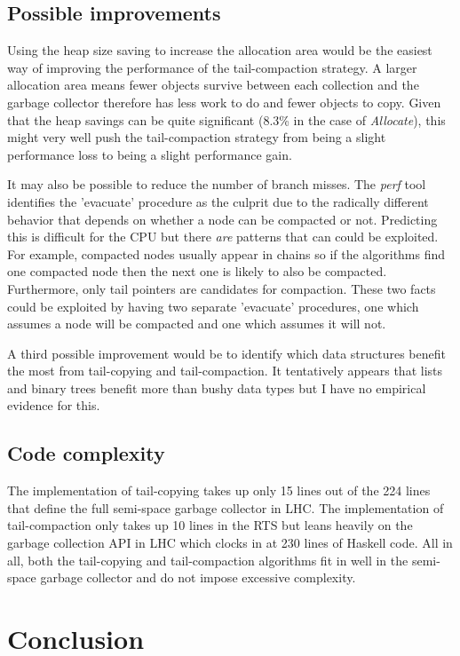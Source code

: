 \documentclass[a4paper,oneside]{memoir}
\begin{document}
\section{Possible improvements}

Using the heap size saving to increase the allocation area would be the easiest
way of improving the performance of the tail-compaction strategy. A larger
allocation area means fewer objects survive between each collection and the
garbage collector therefore has less work to do and fewer objects to copy. Given
that the heap savings can be quite significant (8.3\% in the case of
\emph{Allocate}), this might very well push the tail-compaction strategy from
being a slight performance loss to being a slight performance gain.

It may also be possible to reduce the number of branch misses. The \emph{perf}
tool identifies the 'evacuate' procedure as the culprit due to the radically
different behavior that depends on whether a node can be compacted or not.
Predicting this is difficult for the CPU but there \emph{are} patterns that can
could be exploited. For example, compacted nodes usually appear in chains so
if the algorithms find one compacted node then the next one is likely to also
be compacted. Furthermore, only tail pointers are candidates for compaction.
These two facts could be exploited by having two separate 'evacuate' procedures,
one which assumes a node will be compacted and one which assumes it will not.

A third possible improvement would be to identify which data structures benefit
the most from tail-copying and tail-compaction. It tentatively appears that
lists and binary trees benefit more than bushy data types but I have no
empirical evidence for this.

\section{Code complexity}

The implementation of tail-copying takes up only 15 lines out of the 224 lines
that define the full semi-space garbage collector in LHC. The implementation of
tail-compaction only takes up 10 lines in the RTS but leans heavily on the
garbage collection API in LHC which clocks in at 230 lines of Haskell code. All
in all, both the tail-copying and tail-compaction algorithms fit in well in
the semi-space garbage collector and do not impose excessive complexity.

\chapter{Conclusion}
\end{document}
